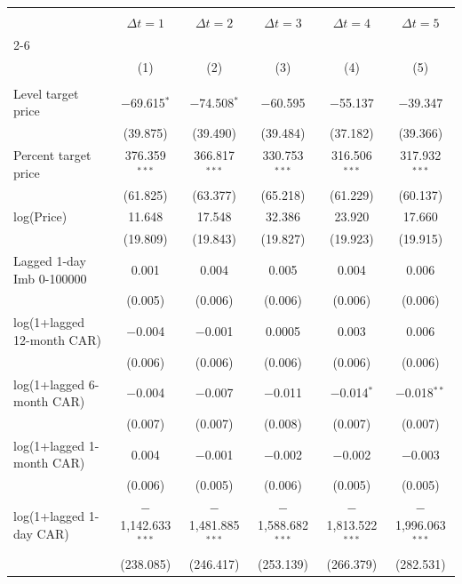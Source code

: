 
\begin{tabular}{@{\extracolsep{5pt}}lccccc} 
\\[-1.8ex]\hline 
\hline \\[-1.8ex] 
 & \multicolumn{1}{c}{\textbf{$\Delta t = 1$}} & \multicolumn{1}{c}{\textbf{$\Delta t = 2$}} & \multicolumn{1}{c}{\textbf{$\Delta t = 3$}} & \multicolumn{1}{c}{\textbf{$\Delta t = 4$}} & \multicolumn{1}{c}{\textbf{$\Delta t = 5$}} \\
\cline{2-6} 
\\[-1.8ex] & (1) & (2) & (3) & (4) & (5)\\ 
\hline \\[-1.8ex] 
 Level target price & $-$69.615$^{*}$ & $-$74.508$^{*}$ & $-$60.595 & $-$55.137 & $-$39.347 \\ 
  & (39.875) & (39.490) & (39.484) & (37.182) & (39.366) \\ 
  Percent target price & 376.359$^{***}$ & 366.817$^{***}$ & 330.753$^{***}$ & 316.506$^{***}$ & 317.932$^{***}$ \\ 
  & (61.825) & (63.377) & (65.218) & (61.229) & (60.137) \\ 
  log(Price) & 11.648 & 17.548 & 32.386 & 23.920 & 17.660 \\ 
  & (19.809) & (19.843) & (19.827) & (19.923) & (19.915) \\ 
  Lagged 1-day Imb 0-100000 & 0.001 & 0.004 & 0.005 & 0.004 & 0.006 \\ 
  & (0.005) & (0.006) & (0.006) & (0.006) & (0.006) \\ 
  log(1+lagged 12-month CAR) & $-$0.004 & $-$0.001 & 0.0005 & 0.003 & 0.006 \\ 
  & (0.006) & (0.006) & (0.006) & (0.006) & (0.006) \\ 
  log(1+lagged 6-month CAR) & $-$0.004 & $-$0.007 & $-$0.011 & $-$0.014$^{*}$ & $-$0.018$^{**}$ \\ 
  & (0.007) & (0.007) & (0.008) & (0.007) & (0.007) \\ 
  log(1+lagged 1-month CAR) & 0.004 & $-$0.001 & $-$0.002 & $-$0.002 & $-$0.003 \\ 
  & (0.006) & (0.005) & (0.006) & (0.005) & (0.005) \\ 
  log(1+lagged 1-day CAR) & $-$1,142.633$^{***}$ & $-$1,481.885$^{***}$ & $-$1,588.682$^{***}$ & $-$1,813.522$^{***}$ & $-$1,996.063$^{***}$ \\ 
  & (238.085) & (246.417) & (253.139) & (266.379) & (282.531) \\ 

\end{tabular}

